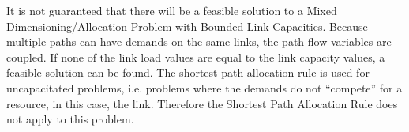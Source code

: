 It is not guaranteed that there will be a feasible solution to a Mixed
Dimensioning/Allocation Problem with Bounded Link Capacities. Because multiple
paths can have demands on the same links, the path flow variables are coupled.
If none of the link load values are equal to the link capacity values, a feasible
solution can be found. The shortest path allocation rule is used for
uncapacitated problems, i.e. problems where the demands do not ``compete'' for a
resource, in this case, the link. Therefore the Shortest Path Allocation Rule
does not apply to this problem.
